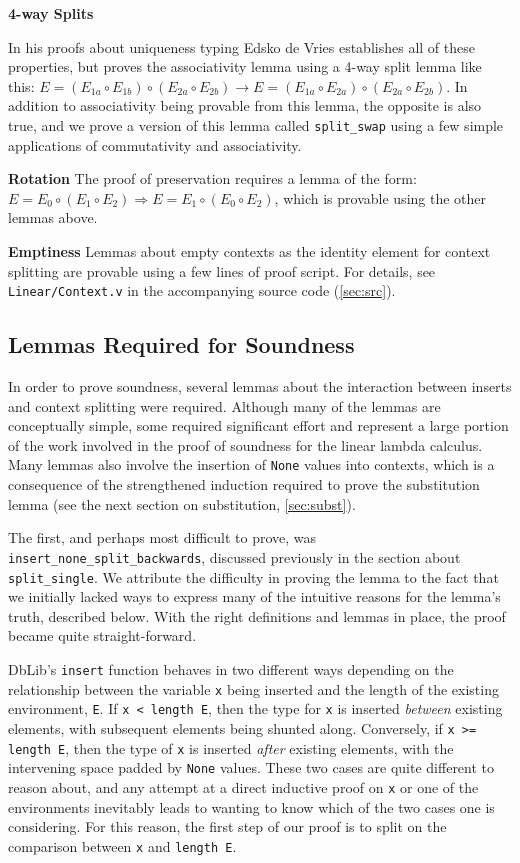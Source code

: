 \documentclass[]{unswthesis}
\let\c\texttt
\let\i\textit
\begin{document}
\textbf{4-way Splits}

In his proofs about uniqueness typing Edsko de Vries \cite{deVries07, deVriesPhD08} establishes all of these properties, but proves the associativity lemma using a 4-way split lemma like this: $E = (E_{1a} \circ E_{1b}) \circ (E_{2a} \circ E_{2b}) \longrightarrow E = (E_{1a} \circ E_{2a}) \circ (E_{2a} \circ E_{2b})$. In addition to associativity being provable from this lemma, the opposite is also true, and we prove a version of this lemma called \c{split_swap} using a few simple applications of commutativity and associativity.

\textbf{Rotation} The proof of preservation requires a lemma of the form: $E = E_0 \circ (E_1 \circ E_2) \Rightarrow E = E_1 \circ (E_0 \circ E_2)$, which is provable using the other lemmas above.

\textbf{Emptiness} Lemmas about empty contexts as the identity element for context splitting are provable using a few lines of proof script. For details, see \c{Linear/Context.v} in the accompanying source code (\cref{sec:src}).

\subsection{Lemmas Required for Soundness}

In order to prove soundness, several lemmas about the interaction between inserts and context splitting were required. Although many of the lemmas are conceptually simple, some required significant effort and represent a large portion of the work involved in the proof of soundness for the linear lambda calculus. Many lemmas also involve the insertion of \c{None} values into contexts, which is a consequence of the strengthened induction required to prove the substitution lemma (see the next section on substitution, \cref{sec:subst}).

The first, and perhaps most difficult to prove, was \c{insert_none_split_backwards}, discussed previously in the section about \c{split_single}. We attribute the difficulty in proving the lemma to the fact that we initially lacked ways to express many of the intuitive reasons for the lemma's truth, described below. With the right definitions and lemmas in place, the proof became quite straight-forward.

DbLib's \c{insert} function behaves in two different ways depending on the relationship between the variable \c{x} being inserted and the length of the existing environment, \c{E}. If \c{x < length E}, then the type for \c{x} is inserted \i{between} existing elements, with subsequent elements being shunted along. Conversely, if \c{x >= length E}, then the type of \c{x} is inserted \i{after} existing elements, with the intervening space padded by \c{None} values. These two cases are quite different to reason about, and any attempt at a direct inductive proof on \c{x} or one of the environments inevitably leads to wanting to know which of the two cases one is considering. For this reason, the first step of our proof is to split on the comparison between \c{x} and \c{length E}.
\end{document}
